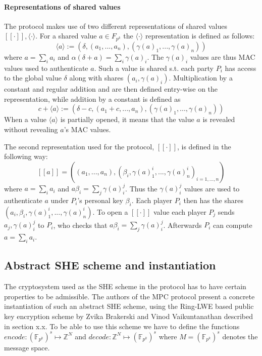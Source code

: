 \documentclass[../main.tex]{subfiles}
\begin{document}
\paragraph{Representations of shared values}
The protocol makes use of two different representations of shared values $[\![ \cdot ]\!], \langle \cdot \rangle$. For a shared value $a \in F_{p^k}$ the $\langle \cdot \rangle$ representation is defined as follows:
$$\langle a \rangle := (\delta, (a_1, ..., a_n), (\gamma(a)_1, ..., \gamma(a)_n))$$
where $a = \sum_i a_i$ and $\alpha (\delta + a) = \sum_i \gamma(a)_i$. The $\gamma(a)_i$ values are thus MAC values used to authenticate $a$. Such a value is shared s.t. each party $P_i$ has access to the global value $\delta$ along with shares $(a_i, \gamma(a)_i)$. Multiplication by a constant and regular addition and  are then defined entry-wise on the representation, while addition by a constant is defined as $$c + \langle a \rangle := (\delta - c, (a_1 + c, ..., a_n), (\gamma(a)_1, ..., \gamma(a)_n))$$
When a value $\langle a \rangle$ is partially opened, it means that the value $a$ is revealed without revealing $a$'s MAC values.

The second representation used for the protocol, $[\![ \cdot ]\!]$, is defined in the following way:
$$[\![ a ]\!] = ((a_1, ..., a_n), (\beta_i, \gamma(a)^i_1, ..., \gamma(a)^i_n)_{i = 1, ..., n})$$
where $a = \sum_i a_i$ and $a\beta_i = \sum_j \gamma(a)^j_i$. Thus the $\gamma(a)^j_i$ values are used to authenticate $a$ under $P_i$'s personal key $\beta_i$. Each player $P_i$ then has the shares $(a_i, \beta_i, \gamma(a)^i_1, ..., \gamma(a)^i_n)$. To open a $[\![ \cdot ]\!]$ value each player $P_j$ sends $a_j, \gamma(a)^j_i$ to $P_i$, who checks that $a\beta_i = \sum_j \gamma(a)^j_i$. Afterwards $P_i$ can compute $a = \sum_i a_i$.

\subsection{Abstract SHE scheme and instantiation}
The cryptosystem used as the SHE scheme in the protocol has to have certain properties to be admissible. The authors of the MPC protocol present a concrete instantiation of such an abstract SHE scheme, using the Ring-LWE based public key encryption scheme by Zvika Brakerski and Vinod Vaikuntanathan \cite{brakerski2011fully} described in section x.x. To be able to use this scheme we have to define the functions $encode: (\mathbb{F}_{p^k})^s \mapsto \mathbb{Z}^N$ and $decode: \mathbb{Z}^N \mapsto (\mathbb{F}_{p^k})^s$ where $M = (\mathbb{F}_{p^k})^s$ denotes the message space.
\end{document}
